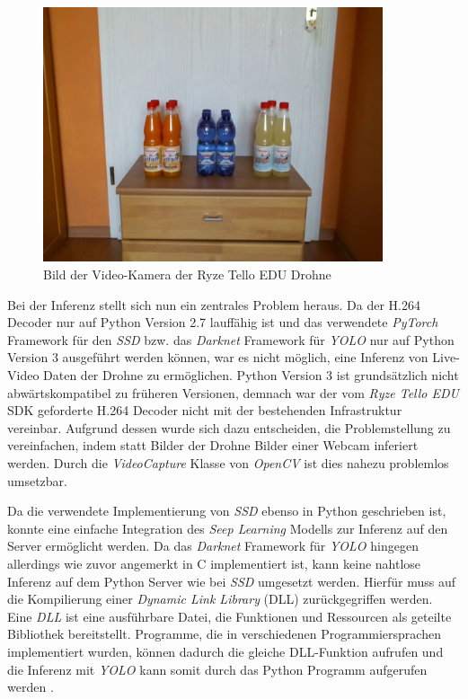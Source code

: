 \begin{figure}[H]
	\begin{center}
		\includegraphics[width=10cm]{Bilder/gesamt.jpeg}
		\caption[Bild der Video-Kamera der Ryze Tello EDU Drohne]{Bild der Video-Kamera der Ryze Tello EDU Drohne}
		\label{rauschen}
	\end{center}
\end{figure}

Bei der Inferenz stellt sich nun ein zentrales Problem heraus. Da der H.264 Decoder nur auf Python Version 2.7 lauffähig ist und das verwendete \textit{PyTorch} Framework für den \textit{SSD} bzw. das \textit{Darknet} Framework für \textit{YOLO} nur auf Python Version 3 ausgeführt werden können, war es nicht möglich, eine Inferenz von Live-Video Daten der Drohne zu ermöglichen. Python Version 3 ist grundsätzlich nicht abwärtskompatibel zu früheren Versionen, demnach war der vom \textit{Ryze Tello EDU} SDK geforderte H.264 Decoder nicht mit der bestehenden Infrastruktur vereinbar. Aufgrund dessen wurde sich dazu entscheiden, die Problemstellung zu vereinfachen, indem statt Bilder der Drohne Bilder einer Webcam inferiert werden. Durch die \textit{VideoCapture} Klasse von \textit{OpenCV} ist dies nahezu problemlos umsetzbar. 

Da die verwendete Implementierung von \textit{SSD} ebenso in Python geschrieben ist, konnte eine einfache Integration des \textit{Seep Learning} Modells zur Inferenz auf den Server ermöglicht werden. Da das \textit{Darknet} Framework für \textit{YOLO} hingegen allerdings wie zuvor angemerkt in C implementiert ist, kann keine nahtlose Inferenz auf dem Python Server wie bei \textit{SSD} umgesetzt werden. Hierfür muss auf die Kompilierung einer \textit{Dynamic Link Library} (DLL) zurückgegriffen werden. Eine \textit{DLL} ist eine ausführbare Datei, die Funktionen und Ressourcen als geteilte Bibliothek bereitstellt. Programme, die in verschiedenen Programmiersprachen implementiert wurden, können dadurch die gleiche DLL-Funktion aufrufen und die Inferenz mit \textit{YOLO} kann somit durch das Python Programm aufgerufen werden \cite{MicrosoftCorporation.27.01.2020}.

